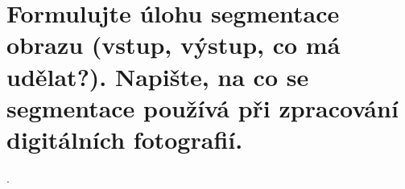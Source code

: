 \section{Formulujte úlohu segmentace obrazu (vstup, výstup, co má udělat?). Napište, na co se segmentace používá při 
zpracování digitálních fotografií.}.